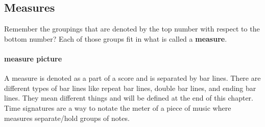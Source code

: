 \documentclass[../OpenAppliedMusicTheory.tex]{subfiles}
\begin{document}
        \subsection{Measures}
        Remember the groupings that are denoted by the top number with respect to the bottom number? Each of those groups fit in what is called a \textbf{measure}.   

        \paragraph{measure picture}
        A measure is denoted as a part of a score and is separated by bar lines. There are different types of bar lines like repeat bar lines, double bar lines, and ending bar lines. They mean different things and will be defined at the end of this chapter. Time signatures are a way to notate the meter of a piece of music where measures separate/hold groups of notes.
\end{document}
